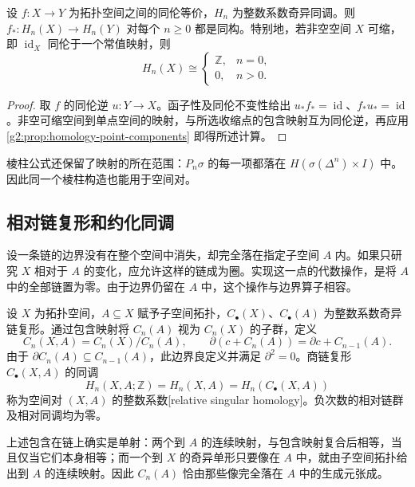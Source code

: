 \begin{corollary}\label{g2:cor:contractible-homology}
	设 \(f:X\to Y\) 为拓扑空间之间的同伦等价，\(H_n\) 为整数系数奇异同调。则 \(f_*:H_n(X)\to H_n(Y)\) 对每个 \(n\ge0\) 都是同构。特别地，若非空空间 \(X\) 可缩，即 \(\operatorname{id}_X\) 同伦于一个常值映射，则
	\[
		H_n(X)\cong
		\begin{cases}
			\mathbb Z,&n=0,\\
			0,&n>0.
		\end{cases}
	\]
\end{corollary}
\begin{proof}
	取 \(f\) 的同伦逆 \(u:Y\to X\)。函子性及同伦不变性给出 \(u_*f_*=\operatorname{id}\)、\(f_*u_*=\operatorname{id}\)。非空可缩空间到单点空间的映射，与所选收缩点的包含映射互为同伦逆，再应用 \cref{g2:prop:homology-point-components} 即得所述计算。
\end{proof}

棱柱公式还保留了映射的所在范围：\(P_n\sigma\) 的每一项都落在 \(H(\sigma(\Delta^n)\times I)\) 中。因此同一个棱柱构造也能用于空间对。

\subsection{相对链复形和约化同调}
\label{g2:subsec:0202:03}
设一条链的边界没有在整个空间中消失，却完全落在指定子空间 \(A\) 内。如果只研究 \(X\) 相对于 \(A\) 的变化，应允许这样的链成为圈。实现这一点的代数操作，是将 \(A\) 中的全部链置为零。由于边界仍留在 \(A\) 中，这个操作与边界算子相容。

\begin{definition}[相对奇异同调]\label{g2:def:relative-singular-homology}
	设 \(X\) 为拓扑空间，\(A\subseteq X\) 赋予子空间拓扑，\(C_\bullet(X)\)、\(C_\bullet(A)\) 为整数系数奇异链复形。通过包含映射将 \(C_n(A)\) 视为 \(C_n(X)\) 的子群，定义
	\[
		C_n(X,A)=C_n(X)/C_n(A),\qquad
		\partial(c+C_n(A))=\partial c+C_{n-1}(A).
	\]
	由于 \(\partial C_n(A)\subseteq C_{n-1}(A)\)，此边界良定义并满足 \(\partial^2=0\)。商链复形 \(C_\bullet(X,A)\) 的同调
	\[
		H_n(X,A;\mathbb Z)=H_n(X,A)
		=H_n(C_\bullet(X,A))
	\]
	称为空间对 \((X,A)\) 的整数系数[relative singular homology]。负次数的相对链群及相对同调均为零。
\end{definition}

上述包含在链上确实是单射：两个到 \(A\) 的连续映射，与包含映射复合后相等，当且仅当它们本身相等；而一个到 \(X\) 的奇异单形只要像在 \(A\) 中，就由子空间拓扑给出到 \(A\) 的连续映射。因此 \(C_n(A)\) 恰由那些像完全落在 \(A\) 中的生成元张成。

